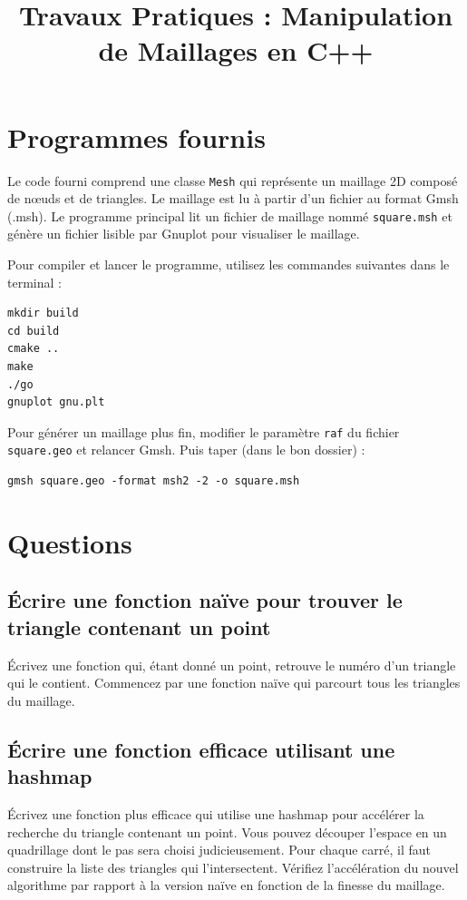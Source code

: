 \documentclass[a4paper,12pt]{article}
\title{Travaux Pratiques : Manipulation de Maillages en C++}
\author{}
\date{}
\begin{document}
\maketitle

\section{Programmes fournis}

Le code fourni comprend une classe \texttt{Mesh} qui représente un maillage 2D composé de nœuds et de triangles. Le maillage est lu à partir d'un fichier au format Gmsh (.msh). Le programme principal lit un fichier de maillage nommé \texttt{square.msh} et génère un fichier lisible par Gnuplot pour visualiser le maillage.

Pour compiler et lancer le programme, utilisez les commandes suivantes dans le terminal :
\begin{verbatim}
mkdir build
cd build
cmake ..
make
./go
gnuplot gnu.plt
\end{verbatim}

Pour générer un maillage plus fin, modifier le paramètre \texttt{raf} du fichier \texttt{square.geo} et relancer Gmsh. Puis taper (dans le bon dossier) :
\begin{verbatim}
gmsh square.geo -format msh2 -2 -o square.msh
\end{verbatim}

\section{Questions}

\subsection{Écrire une fonction naïve pour trouver le triangle contenant un point}

Écrivez une fonction qui, étant donné un point, retrouve le numéro d'un triangle qui le contient. Commencez par une fonction naïve qui parcourt tous les triangles du maillage.

\subsection{Écrire une fonction efficace utilisant une hashmap}

Écrivez une fonction plus efficace qui utilise une hashmap pour accélérer la recherche du triangle contenant un point. Vous pouvez découper l'espace en un quadrillage dont le pas sera choisi judicieusement. Pour chaque carré, il faut construire la liste des triangles qui l'intersectent. Vérifiez l'accélération du nouvel algorithme par rapport à la version naïve en fonction de la finesse du maillage.
\end{document}
